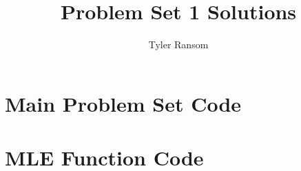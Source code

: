 \documentclass[12pt,english]{article}
\title{Problem Set 1 Solutions}
\author{Tyler Ransom}
\begin{document}
\maketitle

\section{Main Problem Set Code}


\pagebreak{}
\section{MLE Function Code}

\end{document}
